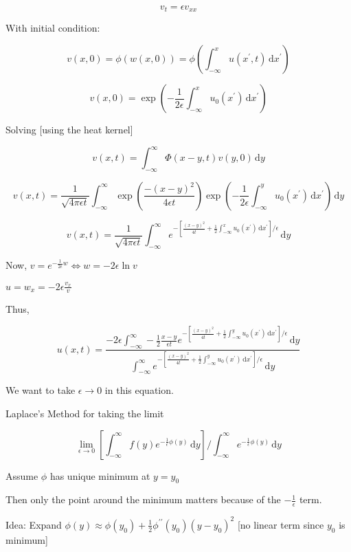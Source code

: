 \documentclass{article}
\theoremstyle{definition}
\begin{document}
\[
    v_t = \epsilon v_{x x}
\]

With initial condition:

\[
    v(x,0) = \phi(w(x,0)) = \phi\left( \int_{-\infty}^{x} u(x^{\prime},t) \,\mathrm{d}x^{\prime}   \right) 
\]

\[
    v(x,0) = \exp\left( -\frac{1}{2\epsilon} \int_{-\infty}^{x} u_0(x^{\prime}) \,\mathrm{d}x^{\prime}   \right) 
\]

Solving [using the heat kernel]

\[
    v(x,t) = \int_{-\infty}^{\infty} \Phi(x-y,t) v(y,0) \,\mathrm{d}y 
\]

\[
    v(x,t) = \frac{1}{\sqrt{4 \pi \epsilon t}} \int_{-\infty}^{\infty} \exp\left( \frac{-(x-y)^2}{4 \epsilon t}\right) \exp \left( -\frac{1}{2\epsilon} \int_{-\infty}^{y} u_0(x^{\prime}) \,\mathrm{d}x^{\prime}  \right)   \,\mathrm{d}y 
\]

\[
    v(x,t) = \frac{1}{\sqrt{4 \pi \epsilon t}} \int_{-\infty}^{\infty} e^{ - \left[ \frac{(x-y)^2}{4t} + \frac{1}{2} \int_{-\infty}^{x} u_0(x^{\prime}) \,\mathrm{d}x^{\prime}   \right] \big/ \epsilon } \,\mathrm{d}y 
\]

Now, \(v = e^{-\frac{1}{2 \epsilon}w} \iff w = - 2 \epsilon \ln v\)

\(u = w_x = - 2\epsilon \frac{v_x}{v}\) 

Thus,

\[
    u(x,t) = \frac{ - 2 \epsilon \int_{-\infty}^{\infty} -\frac{1}{2} \frac{x-y}{\epsilon t} e^{-\left[ \frac{(x-y)^2}{4t} + \frac{1}{2} \int_{-\infty}^{y} u_0(x^{\prime}) \,\mathrm{d}x^{\prime} \right]  \big/ \epsilon} \,\mathrm{d}y}{ \int_{-\infty}^{\infty} e^{-\left[ \frac{(x-y)^2}{4t} + \frac{1}{2} \int_{-\infty}^{y} u_0(x^{\prime}) \,\mathrm{d}x^{\prime} \right]  \big/ \epsilon} \,\mathrm{d}y }
\]

We want to take \(\epsilon \to 0\) in this equation.

Laplace's Method for taking the limit

\[
    \lim_{\epsilon \to 0} \left[\int_{-\infty}^{\infty} f(y) e^{- \frac{1}{\epsilon } \phi(y)} \,\mathrm{d}y \right] \bigg / \int_{-\infty}^{\infty} e^{- \frac{1}{\epsilon} \phi(y)} \,\mathrm{d}y 
\]

Assume \(\phi\) has unique minimum at \(y = y_0\) 

Then only the point around the minimum matters because of the \(-\frac{1}{\epsilon}\) term.

Idea: Expand \(\phi(y) \approx \phi(y_0) + \frac{1}{2} \phi^{\prime\prime} (y_0) (y - y_0)^2\) [no linear term since \(y_0\) is minimum]
\end{document}
